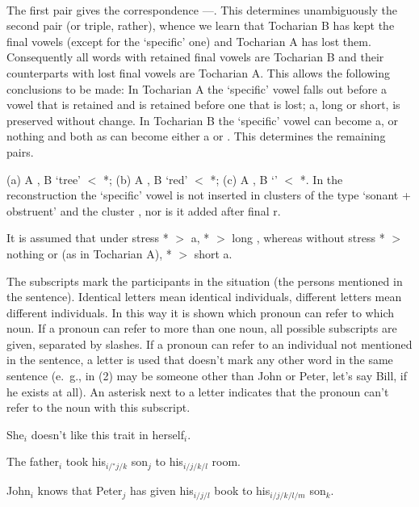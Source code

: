 \medskip
\tochdone
\medskip \\
%
The first pair gives the correspondence ---.
This determines unambiguously the second pair (or triple, rather), whence we learn
that Tocharian B has kept the final vowels (except for the `specific' one) and Tocharian A has lost them.
Consequently all words  with retained final vowels are Tocharian B
and their counterparts with lost final vowels are Tocharian A.
This allows the following conclusions to be made:
In Tocharian A the `specific' vowel falls out before a vowel that is retained
and is retained before one that is lost;
\wipa a, long or short, is preserved without change.
In Tocharian B the `specific' vowel can become \wipa a, \wipa{\schwa} or nothing
and both {\wipa a\/}s can become either \wipa a or \wipa{\A}.
This determines the remaining pairs.

\assignment
%
(a) A , B  `tree' $<$ *;
(b) A , B  `red' $<$ *;
(c) A , B  `' $<$ *.
%
In the reconstruction the `specific' vowel is not inserted in clusters of the type
`sonant + obstruent' and the cluster ,
nor is it added after final \wipa r.

\assignment
It is assumed that under stress *\wipa{\schwa} $>$ \wipa a, * $>$ long \wipa{\A},
whereas without stress *\wipa{\schwa} $>$ nothing or \wipa{\schwa} (as in Tocharian A),
* $>$ short \wipa a.

\solution
%
\assignment The subscripts mark the participants in the situation (the persons mentioned in the sentence).
Identical letters mean identical individuals, different letters mean different individuals.
In this way it is shown which pronoun can refer to which noun.
If a pronoun can refer to more than one noun,
all possible subscripts are given, separated by slashes.
If a pronoun can refer to an individual not mentioned in the sentence,
a letter is used that doesn't mark any other word in the same sentence
(e.~g.,  in (2) may be someone other than John or Peter, let's say Bill, if he exists at all).
An asterisk next to a letter indicates
that the pronoun can't refer to the noun with this subscript.

\assignment
\begin{items}
\item She$_i$ doesn't like this trait in herself$_i$.
\item The father$_i$ took his$_{i/{}^*j/k}$ son$_j$ to his$_{i/j/k/l}$ room.
\item John$_i$ knows that Peter$_j$ has given his$_{i/j/l}$ book to his$_{i/j/k/l/m}$ son$_k$.
\end{items}

